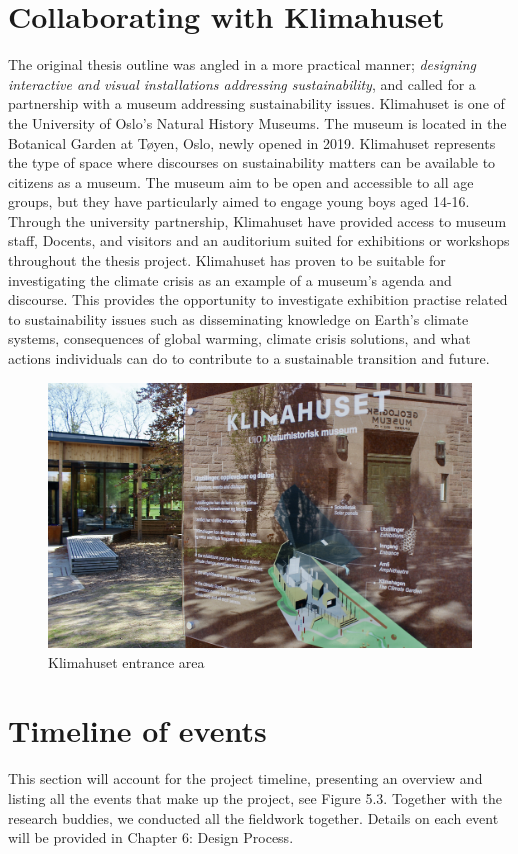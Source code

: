 \section{Collaborating with Klimahuset}
The original thesis outline was angled in a more practical manner; \emph{designing interactive and visual installations addressing sustainability}, and called for a partnership with a museum addressing sustainability issues. Klimahuset is one of the University of Oslo's Natural History Museums. The museum is located in the Botanical Garden at Tøyen, Oslo, newly opened in 2019. Klimahuset represents the type of space where discourses on sustainability matters can be available to citizens as a museum. The museum aim to be open and accessible to all age groups, but they have particularly aimed to engage young boys aged 14-16. Through the university partnership, Klimahuset have provided access to museum staff, Docents, and visitors and an auditorium suited for exhibitions or workshops throughout the thesis project. Klimahuset has proven to be suitable for investigating the climate crisis as an example of a museum's agenda and discourse. This provides the opportunity to investigate exhibition practise related to sustainability issues such as disseminating knowledge on Earth’s climate systems, consequences of global warming, climate crisis solutions, and what actions individuals can do to contribute to a sustainable transition and future.

\begin{figure}[H]
\includegraphics[width=12cm]{pictures/klimahuset/klimahuset_info.JPG}
\caption{Klimahuset entrance area}
\centering 
\end{figure}

\section{Timeline of events}
This section will account for the project timeline, presenting an overview and listing all the events that make up the project, see Figure 5.3. Together with the research buddies, we conducted all the fieldwork together. Details on each event will be provided in Chapter 6: Design Process.

